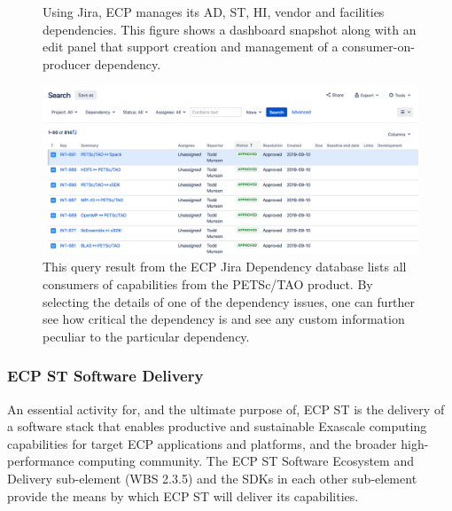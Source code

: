 \begin{figure}
	\centering
	\caption{Using Jira, ECP manages its AD, ST, HI, vendor and facilities dependencies.  This figure shows a dashboard snapshot along with an edit panel that support creation and management of a consumer-on-producer dependency.}
	\label{fig:dependency-dashboard-edit}
\end{figure}

\begin{figure}
	\centering
	\includegraphics[width=0.9\linewidth]{PETSc-TAO-Dependencies}
	\caption{This query result from the ECP Jira Dependency database lists all consumers of capabilities from the PETSc/TAO product.  By selecting the details of one of the dependency issues, one can further see how critical the dependency is and see any custom information peculiar to the particular dependency.}
	\label{fig:petsc-tao-dependencies}
\end{figure}

\subsubsection{ECP ST Software Delivery}
An essential activity for, and the ultimate purpose of, ECP ST is the delivery of a software stack that enables productive and sustainable Exascale computing capabilities for target ECP applications and platforms, and the broader high-performance computing community. The ECP ST Software Ecosystem and Delivery sub-element (WBS 2.3.5) and the SDKs in each other sub-element provide the means by which ECP ST will deliver its capabilities.
